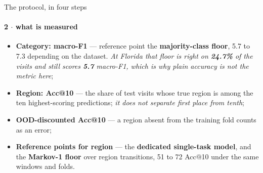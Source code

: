 \documentclass{beamer}
\begin{document}
\begin{frame}{The protocol, in four steps}
    \framesubtitle{2 $\cdot$ what is measured}

    \begin{itemize}\setlength{\itemsep}{5pt}
        \item \textbf{Category: macro-F1} --- reference point the \textbf{majority-class floor},
              \alert{5.7 to 7.3} depending on the dataset. \emph{At Florida that floor is right on
              \textbf{24.7\%} of the visits and still scores \textbf{5.7} macro-F1, which is why
              plain accuracy is not the metric here};
        \item \textbf{Region: Acc@10} --- the share of test visits whose true region is among the
              ten highest-scoring predictions; \emph{it does not separate first place from tenth};
        \item \textbf{OOD-discounted Acc@10} --- a region absent from the training fold counts as
              an error;
        \item \textbf{Reference points for region} --- the \textbf{dedicated single-task model},
              and the \textbf{Markov-1 floor} over region transitions, \alert{51 to 72} Acc@10
              under the same windows and folds.
    \end{itemize}
\end{frame}
\end{document}

